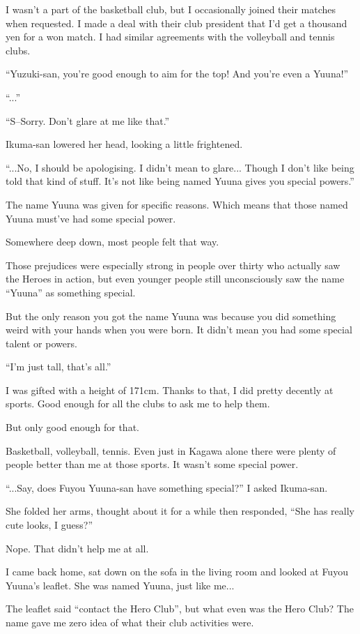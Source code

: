 I wasn't a part of the basketball club, but I occasionally joined their matches when requested. I made a deal with their club president that I'd get a thousand yen for a won match. I had similar agreements with the volleyball and tennis clubs.

``Yuzuki-san, you're good enough to aim for the top! And you're even a Yuuna!''

``...''

``S--Sorry. Don't glare at me like that.''

Ikuma-san lowered her head, looking a little frightened.

``...No, I should be apologising. I didn't mean to glare... Though I don't like being told that kind of stuff. It's not like being named Yuuna gives you special powers.''

The name Yuuna was given for specific reasons. Which means that those named Yuuna must've had some special power.

Somewhere deep down, most people felt that way.

Those prejudices were especially strong in people over thirty who actually saw the Heroes in action, but even younger people still unconsciously saw the name ``Yuuna'' as something special.

But the only reason you got the name Yuuna was because you did something weird with your hands when you were born. It didn't mean you had some special talent or powers.

``I'm just tall, that's all.''

I was gifted with a height of 171cm. Thanks to that, I did pretty decently at sports. Good enough for all the clubs to ask me to help them.

But only good enough for that.

Basketball, volleyball, tennis. Even just in Kagawa alone there were plenty of people better than me at those sports. It wasn't some special power.

``...Say, does Fuyou Yuuna-san have something special?'' I asked Ikuma-san.

She folded her arms, thought about it for a while then responded, ``She has really cute looks, I guess?''

Nope. That didn't help me at all.

I came back home, sat down on the sofa in the living room and looked at Fuyou Yuuna's leaflet. She was named Yuuna, just like me...

The leaflet said ``contact the Hero Club'', but what even was the Hero Club? The name gave me zero idea of what their club activities were.

